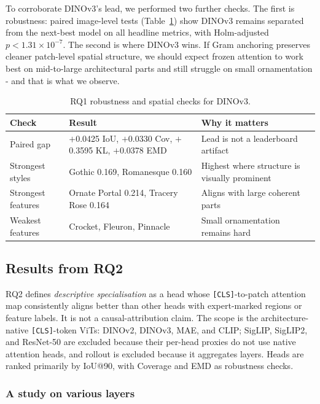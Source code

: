 \documentclass[lineno,pdflatex,sn-mathphys-num]{sn-jnl}%
\theoremstyle{thmstyleone}%
\theoremstyle{thmstyletwo}%
\theoremstyle{thmstylethree}%
\begin{document}
To corroborate DINOv3's lead, we performed two further checks. The first is robustness: paired image-level tests (Table~\ref{table RQ1 dinov3}) show DINOv3 remains separated from the next-best model on all headline metrics, with Holm-adjusted $p\!<\!1.31\!\times\!10^{-7}$. The second is where DINOv3 wins. If Gram anchoring preserves cleaner patch-level spatial structure, we should expect frozen attention to work best on mid-to-large architectural parts and still struggle on small ornamentation - and that is what we observe.

\begin{table}[!h]
\centering
\caption{RQ1 robustness and spatial checks for DINOv3. \label{table RQ1 dinov3}}
\begin{tabular}{lp{}p{}}
\toprule
Check & Result & Why it matters \\
\midrule
Paired gap & $+$0.0425 IoU, $+$0.0330 Cov, $+$0.3595 KL, $+$0.0378 EMD & Lead is not a leaderboard artifact \\
Strongest styles & Gothic 0.169, Romanesque 0.160 & Highest where structure is visually prominent \\
Strongest features & Ornate Portal 0.214, Tracery Rose 0.164 & Aligns with large coherent parts \\
Weakest features & Crocket, Fleuron, Pinnacle & Small ornamentation remains hard \\
\bottomrule
\end{tabular}
\end{table}



\subsection{Results from RQ2}

RQ2 defines \emph{descriptive specialisation} as a head whose \texttt{[CLS]}-to-patch attention map consistently aligns better than other heads with expert-marked regions or feature labels. It is not a causal-attribution claim. The scope is the architecture-native \texttt{[CLS]}-token ViTs: DINOv2, DINOv3, MAE, and CLIP; SigLIP, SigLIP2, and ResNet-50 are excluded because their per-head proxies do not use native attention heads, and rollout is excluded because it aggregates layers. Heads are ranked primarily by IoU@90, with Coverage and EMD as robustness checks.

\subsubsection{A study on various layers}
\end{document}
